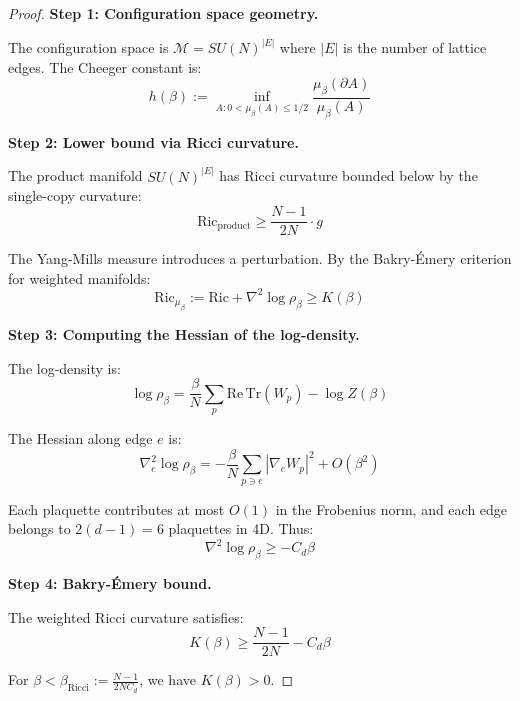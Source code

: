 \begin{proof}
\textbf{Step 1: Configuration space geometry.}

The configuration space is $\mathcal{M} = SU(N)^{|E|}$ where $|E|$ is the number 
of lattice edges. The Cheeger constant is:
\begin{equation}
h(\beta) := \inf_{A: 0 < \mu_\beta(A) \leq 1/2} \frac{\mu_\beta(\partial A)}{\mu_\beta(A)}
\end{equation}

\textbf{Step 2: Lower bound via Ricci curvature.}

The product manifold $SU(N)^{|E|}$ has Ricci curvature bounded below by the 
single-copy curvature:
\begin{equation}
\text{Ric}_{\text{product}} \geq \frac{N-1}{2N} \cdot g
\end{equation}

The Yang-Mills measure introduces a perturbation. By the Bakry-Émery criterion
for weighted manifolds:
\begin{equation}
\text{Ric}_{\mu_\beta} := \text{Ric} + \nabla^2 \log \rho_\beta \geq K(\beta)
\end{equation}

\textbf{Step 3: Computing the Hessian of the log-density.}

The log-density is:
\begin{equation}
\log \rho_\beta = \frac{\beta}{N} \sum_p \text{Re}\,\text{Tr}(W_p) - \log Z(\beta)
\end{equation}

The Hessian along edge $e$ is:
\begin{equation}
\nabla_e^2 \log \rho_\beta = -\frac{\beta}{N} \sum_{p \ni e} |\nabla_e W_p|^2 + O(\beta^2)
\end{equation}

Each plaquette contributes at most $O(1)$ in the Frobenius norm, and each edge 
belongs to $2(d-1) = 6$ plaquettes in 4D. Thus:
\begin{equation}
\nabla^2 \log \rho_\beta \geq -C_d \beta
\end{equation}

\textbf{Step 4: Bakry-Émery bound.}

The weighted Ricci curvature satisfies:
\begin{equation}
K(\beta) \geq \frac{N-1}{2N} - C_d \beta
\end{equation}

For $\beta < \beta_{\text{Ricci}} := \frac{N-1}{2NC_d}$, we have $K(\beta) > 0$.


\end{proof}

